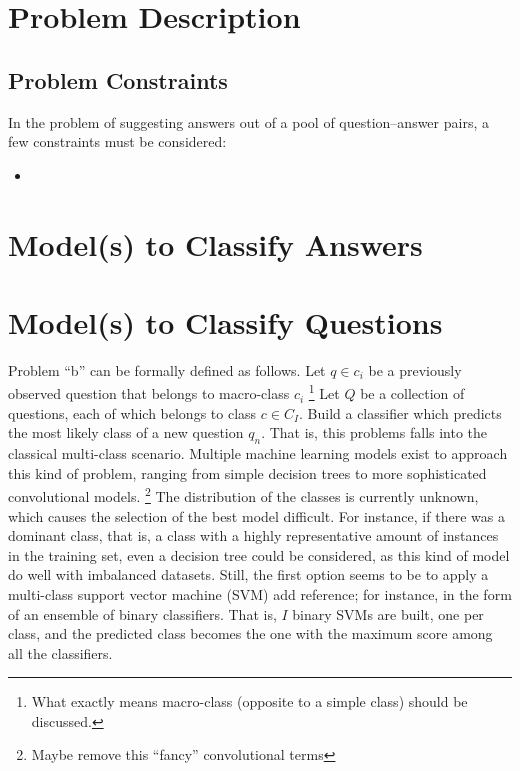 \documentclass{sig-alternate-05-2015}
\newcommand{\abc}[1]{{\color{red} #1}}
\begin{document}
\section{Problem Description} 


\subsection{Problem Constraints}

In the problem of suggesting answers out of a pool of question--answer pairs, a 
few constraints must be considered:

\begin{itemize}
\item 
\end{itemize}





\section{Model(s) to Classify Answers}
\label{sec:l2r}


\section{Model(s) to Classify Questions}
Problem ``b'' can be formally defined as follows. Let $q\in c_i$ be a 
previously observed question that belongs to macro-class $c_i$%
\footnote{What exactly means macro-class (opposite to a simple class) 
should be discussed.}
Let $Q$ be a collection of questions, each of which belongs to class $c\in 
C_I$. Build a classifier which predicts the most likely class of a new 
question $q_n$. That is, this problems falls into the classical 
multi-class scenario. Multiple machine learning models exist to approach this 
kind of problem, ranging from simple decision trees to more sophisticated 
convolutional models.%
\footnote{Maybe remove this ``fancy'' convolutional terms}
The distribution of the classes is currently unknown, which causes the 
selection of the best model difficult. For instance, if there was a dominant 
class, that is, a class with a highly representative amount of instances in the 
training set, even a decision tree could be considered, as this kind of model 
do well with imbalanced datasets. Still, the first option seems to be to apply 
a multi-class support vector machine (SVM)\abc{add reference}; for instance, 
in the form of an ensemble of binary classifiers. That is, $I$ binary SVMs are 
built, one per class, and the predicted class becomes the one with the 
maximum score among all the classifiers. 
\end{document}
